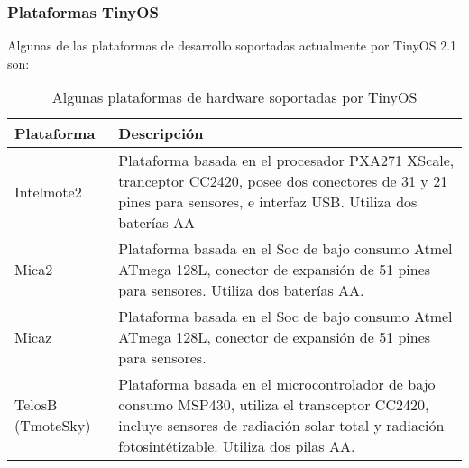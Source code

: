 \subsubsection{Plataformas TinyOS}
Algunas de las plataformas de desarrollo soportadas actualmente por TinyOS 2.1 son:

\begin{center}
\begin{table}[H]
\caption{Algunas plataformas de hardware soportadas por TinyOS} 
\begin{tabular}{|l|p{10cm}|}
\hline \textbf{Plataforma} & \textbf{Descripción} \\ 

\hline Intelmote2 \cite{IntelMote2Web} &  Plataforma basada en el procesador PXA271 XScale, tranceptor CC2420, posee dos conectores de 31 y 21 pines para sensores,  e interfaz USB. Utiliza dos baterías AA\\ 


\hline Mica2 \cite{Mica2Datasheet} &  Plataforma basada en el Soc de bajo consumo Atmel ATmega 128L, conector de expansión de 51 pines para sensores. Utiliza dos baterías AA. \\ 

\hline Micaz \cite{MicazDatasheet} &  Plataforma basada en el Soc de bajo consumo Atmel ATmega 128L, conector de expansión de 51 pines para sensores. \\ 


\hline TelosB (TmoteSky) \cite{TelosBDatasheet} & Plataforma basada en el microcontrolador de bajo consumo MSP430, utiliza el transceptor CC2420, incluye sensores de radiación solar total y radiación fotosintétizable. Utiliza dos pilas AA.  \\ 

\hline 

\end{tabular}

\end{table} 
\end{center}


